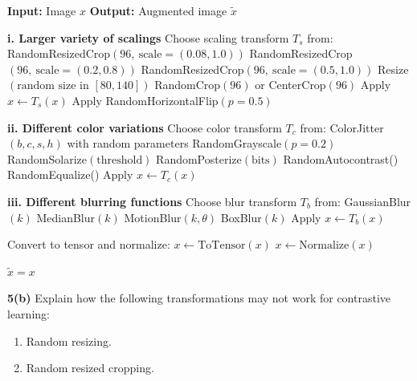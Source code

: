 \documentclass[10pt]{article}
\begin{document}
\begin{algorithm}[H]
	\caption{Expanded Contrastive Transforms}
	\begin{algorithmic}[1]
		\State \textbf{Input:} Image $x$
		\State \textbf{Output:} Augmented image $\tilde{x}$
		
		\Statex
		
		\State \textbf{i. Larger variety of scalings}
		\State Choose scaling transform $T_s$ from:
		\State \quad RandomResizedCrop$(96,\ \text{scale}=(0.08,1.0))$
		\State \quad RandomResizedCrop$(96,\ \text{scale}=(0.2,0.8))$
		\State \quad RandomResizedCrop$(96,\ \text{scale}=(0.5,1.0))$
		\State \quad Resize$(\text{random size in }[80,140])$
		\State \quad RandomCrop$(96)$ or CenterCrop$(96)$
		\State Apply $x \leftarrow T_s(x)$
		\State Apply RandomHorizontalFlip$(p=0.5)$
		
		\Statex
		
		\State \textbf{ii. Different color variations}
		\State Choose color transform $T_c$ from:
		\State \quad ColorJitter$(b,c,s,h)$ with random parameters
		\State \quad RandomGrayscale$(p=0.2)$
		\State \quad RandomSolarize$(\text{threshold})$
		\State \quad RandomPosterize$(\text{bits})$
		\State \quad RandomAutocontrast()
		\State \quad RandomEqualize()
		\State Apply $x \leftarrow T_c(x)$
		
		\Statex
		
		\State \textbf{iii. Different blurring functions}
		\State Choose blur transform $T_b$ from:
		\State \quad GaussianBlur$(k)$
		\State \quad MedianBlur$(k)$
		\State \quad MotionBlur$(k,\theta)$
		\State \quad BoxBlur$(k)$
		\State Apply $x \leftarrow T_b(x)$
		
		\Statex
		
		\State Convert to tensor and normalize:
		\State $x \leftarrow \text{ToTensor}(x)$
		\State $x \leftarrow \text{Normalize}(x)$
		
		\State \Return $\tilde{x} = x$
	\end{algorithmic}
\end{algorithm}

\newpage

\textbf{5(b)} Explain how the following transformations may not work for contrastive learning:

\begin{enumerate}[label=\roman*.]
    \item Random resizing.
    \item Random resized cropping.
\end{enumerate}
\end{document}

